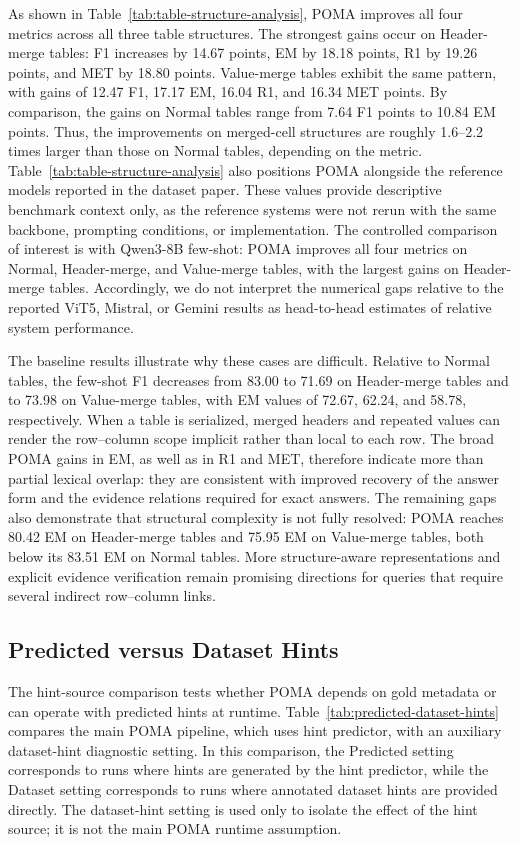 \documentclass[]{interact}
\begin{document}
As shown in Table~\ref{tab:table-structure-analysis}, POMA improves all four metrics across all three table structures. The strongest gains occur on Header-merge tables: F1 increases by 14.67 points, EM by 18.18 points, R1 by 19.26 points, and MET by 18.80 points. Value-merge tables exhibit the same pattern, with gains of 12.47 F1, 17.17 EM, 16.04 R1, and 16.34 MET points. By comparison, the gains on Normal tables range from 7.64 F1 points to 10.84 EM points. Thus, the improvements on merged-cell structures are roughly 1.6--2.2 times larger than those on Normal tables, depending on the metric.
Table~\ref{tab:table-structure-analysis} also positions POMA alongside the reference models reported in the dataset paper. These values provide descriptive benchmark context only, as the reference systems were not rerun with the same backbone, prompting conditions, or implementation. The controlled comparison of interest is with Qwen3-8B few-shot: POMA improves all four metrics on Normal, Header-merge, and Value-merge tables, with the largest gains on Header-merge tables. Accordingly, we do not interpret the numerical gaps relative to the reported ViT5, Mistral, or Gemini results as head-to-head estimates of relative system performance.

The baseline results illustrate why these cases are difficult. Relative to Normal tables, the few-shot F1 decreases from 83.00 to 71.69 on Header-merge tables and to 73.98 on Value-merge tables, with EM values of 72.67, 62.24, and 58.78, respectively. When a table is serialized, merged headers and repeated values can render the row--column scope implicit rather than local to each row. The broad POMA gains in EM, as well as in R1 and MET, therefore indicate more than partial lexical overlap: they are consistent with improved recovery of the answer form and the evidence relations required for exact answers. The remaining gaps also demonstrate that structural complexity is not fully resolved: POMA reaches 80.42 EM on Header-merge tables and 75.95 EM on Value-merge tables, both below its 83.51 EM on Normal tables. More structure-aware representations and explicit evidence verification remain promising directions for queries that require several indirect row--column links.

\subsection{Predicted versus Dataset Hints}

The hint-source comparison tests whether POMA depends on gold metadata or can operate with predicted hints at runtime. Table~\ref{tab:predicted-dataset-hints} compares the main POMA pipeline, which uses hint predictor, with an auxiliary dataset-hint diagnostic setting. In this comparison, the Predicted setting corresponds to runs where hints are generated by the hint predictor, while the Dataset setting corresponds to runs where annotated dataset hints are provided directly. The dataset-hint setting is used only to isolate the effect of the hint source; it is not the main POMA runtime assumption.
\end{document}
